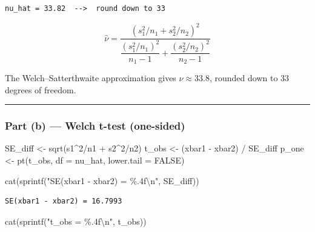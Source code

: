 \documentclass[
  letterpaper,
  DIV=11,
  numbers=noendperiod]{scrartcl}
\newenvironment{Shaded}{\begin{snugshade}}{\end{snugshade}}
\newcommand{\AttributeTok}[1]{\textcolor[rgb]{0.40,0.45,0.13}{#1}}
\newcommand{\ConstantTok}[1]{\textcolor[rgb]{0.56,0.35,0.01}{#1}}
\newcommand{\DecValTok}[1]{\textcolor[rgb]{0.68,0.00,0.00}{#1}}
\newcommand{\FunctionTok}[1]{\textcolor[rgb]{0.28,0.35,0.67}{#1}}
\newcommand{\NormalTok}[1]{\textcolor[rgb]{0.00,0.23,0.31}{#1}}
\newcommand{\OtherTok}[1]{\textcolor[rgb]{0.00,0.23,0.31}{#1}}
\newcommand{\SpecialCharTok}[1]{\textcolor[rgb]{0.37,0.37,0.37}{#1}}
\newcommand{\StringTok}[1]{\textcolor[rgb]{0.13,0.47,0.30}{#1}}
\begin{document}
\begin{verbatim}
nu_hat = 33.82  -->  round down to 33
\end{verbatim}

\[\hat{\nu} = \frac{(s_1^2/n_1 + s_2^2/n_2)^2}{\dfrac{(s_1^2/n_1)^2}{n_1-1} + \dfrac{(s_2^2/n_2)^2}{n_2-1}}\]

The Welch--Satterthwaite approximation gives \(\hat{\nu} \approx 33.8\),
rounded down to \(33\) degrees of freedom.

\begin{center}\rule{0.5\linewidth}{0.5pt}\end{center}

\subsubsection{Part (b) --- Welch t-test
(one-sided)}\label{part-b-welch-t-test-one-sided}

\begin{Shaded}
\begin{Highlighting}[]
\NormalTok{SE\_diff }\OtherTok{\textless{}{-}} \FunctionTok{sqrt}\NormalTok{(s1}\SpecialCharTok{\^{}}\DecValTok{2}\SpecialCharTok{/}\NormalTok{n1 }\SpecialCharTok{+}\NormalTok{ s2}\SpecialCharTok{\^{}}\DecValTok{2}\SpecialCharTok{/}\NormalTok{n2)}
\NormalTok{t\_obs   }\OtherTok{\textless{}{-}}\NormalTok{ (xbar1 }\SpecialCharTok{{-}}\NormalTok{ xbar2) }\SpecialCharTok{/}\NormalTok{ SE\_diff}
\NormalTok{p\_one   }\OtherTok{\textless{}{-}} \FunctionTok{pt}\NormalTok{(t\_obs, }\AttributeTok{df =}\NormalTok{ nu\_hat, }\AttributeTok{lower.tail =} \ConstantTok{FALSE}\NormalTok{)}

\FunctionTok{cat}\NormalTok{(}\FunctionTok{sprintf}\NormalTok{(}\StringTok{"SE(xbar1 {-} xbar2) = \%.4f}\SpecialCharTok{\textbackslash{}n}\StringTok{"}\NormalTok{, SE\_diff))}
\end{Highlighting}
\end{Shaded}

\begin{verbatim}
SE(xbar1 - xbar2) = 16.7993
\end{verbatim}

\begin{Shaded}
\begin{Highlighting}[]
\FunctionTok{cat}\NormalTok{(}\FunctionTok{sprintf}\NormalTok{(}\StringTok{"t\_obs = \%.4f}\SpecialCharTok{\textbackslash{}n}\StringTok{"}\NormalTok{, t\_obs))}
\end{Highlighting}
\end{Shaded}
\end{document}
